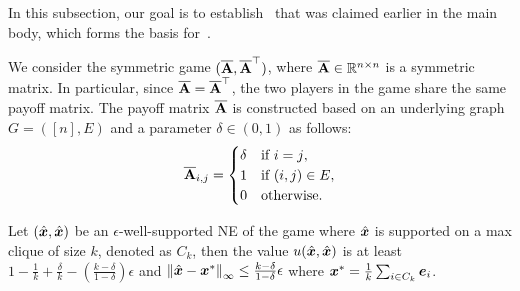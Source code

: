 In this subsection, our goal is to establish~ that was claimed earlier in the main body, which forms the basis for~.

We consider the symmetric game $(\overline{\mathbf{A}}, \overline{\mathbf{A}}^{\top})$, where $\overline{\mathbf{A}} \in \mathbb{R}^{n \times n}$ is a symmetric matrix. In particular, since $\overline{\mathbf{A}} = \overline{\mathbf{A}}^{\top}$, the two players in the game share the same payoff matrix. The payoff matrix $\overline{\mathbf{A}}$ is constructed based on an underlying graph $G = ([n], E) $ and a parameter $\delta \in (0, 1)$ as follows:
\begin{align*}
    \overline{\mathbf{A}}_{i, j} = 
    \begin{cases}
        \delta & \text{if $i = j$}, \\
        1 & \text{if $(i, j) \in E$}, \\
        0 & \text{otherwise.}
    \end{cases}
\end{align*}

\begin{lemma} \label{lemma:value_of_approx_nash_on_clique}
    Let $(\hat{{\bm{x}}}, \hat{{\bm{x}}})$ be an $\epsilon$-well-supported NE of the game where $\hat{{\bm{x}}}$ is supported on a max clique of size $k$, denoted as $C_k$, then the value $u(\hat{{\bm{x}}}, \hat{{\bm{x}}})$ is at least $ 1 - \frac{1}{k} + \frac{\delta}{k} - (\frac{k - \delta}{1 - \delta})  \epsilon$ and $\left\| \hat{{\bm{x}}} - {\bm{x}}^* \right\|_{\infty} \leq \frac{k - \delta}{1 - \delta} \epsilon$ where ${\bm{x}}^* = \frac{1}{k} \sum_{i \in C_k} {\bm{e}}_{i}$.
\end{lemma}

